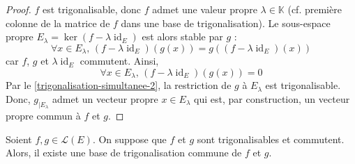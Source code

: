   \begin{proof}
    $f$ est trigonalisable, donc $f$ admet une valeur propre $\lambda \in \mathbb{K}$ (cf. première colonne de la matrice de $f$ dans une base de trigonalisation). Le sous-espace propre $E_\lambda = \ker(f - \lambda \operatorname{id}_E)$ est alors stable par $g$ :
    \[ \forall x \in E_\lambda, \, (f - \lambda \operatorname{id}_E)(g(x)) = g((f - \lambda \operatorname{id}_E)(x)) \]
    car $f$, $g$ et $\lambda \operatorname{id}_E$ commutent. Ainsi,
    \[ \forall x \in E_\lambda, \, (f - \lambda \operatorname{id}_E)(g(x)) = 0 \]
    Par le \cref{trigonalisation-simultanee-2}, la restriction de $g$ à $E_\lambda$ est trigonalisable. Donc, $g_{|E_\lambda}$ admet un vecteur propre $x \in E_\lambda$ qui est, par construction, un vecteur propre commun à $f$ et $g$.
  \end{proof}

  \begin{theorem}
    Soient $f, g \in \mathcal{L}(E)$. On suppose que $f$ et $g$ sont trigonalisables et commutent. Alors, il existe une base de trigonalisation commune de $f$ et $g$.
  \end{theorem}

